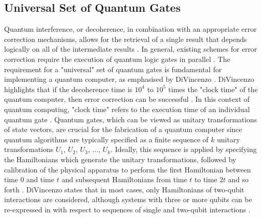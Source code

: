 \subsection{Universal Set of Quantum Gates}

Quantum interference, or decoherence, in combination with an appropriate error correction mechanisms, allows for the retrieval of a single result that depends logically on all of the intermediate results \cite{deutsch1998quantum}. In general, existing schemes for error correction require the execution of quantum logic gates in parallel \cite{sherwin1999quantum}. The requirement for a "universal" set of quantum gates is fundamental for implementing a quantum computer, as emphasised by DiVincenzo \cite{divincenzo2000physical}. DiVincenzo highlights that if the decoherence time is $10^4$ to $10^5$ times the "clock time" of the quantum computer, then error correction can be successful \cite{divincenzo2000physical}. In this context of quantum computing, "clock time" refers to the execution time of an individual quantum gate \cite{divincenzo2000physical}. Quantum gates, which can be viewed as unitary transformations of state vectors, are crucial for the fabrication of a quantum computer since quantum algorithms are typically specified as a finite sequence of $k$ unitary transformations $U_1$, $U_2$, $U_3$, ..., $U_k$. Ideally, this sequence is applied by specifying the Hamiltonians which generate the unitary transformations, followed by calibration of the physical apparatus to perform the first Hamiltonian between time $0$ and time $t$ and subsequent Hamiltonians from time $t$ to time $2t$ and so forth \cite{divincenzo2000physical}. DiVincenzo states that in most cases, only Hamiltonians of two-qubit interactions are considered, although systems with three or more qubits can be re-expressed in with respect to sequences of single and two-qubit interactions \cite{divincenzo2000physical}. 

